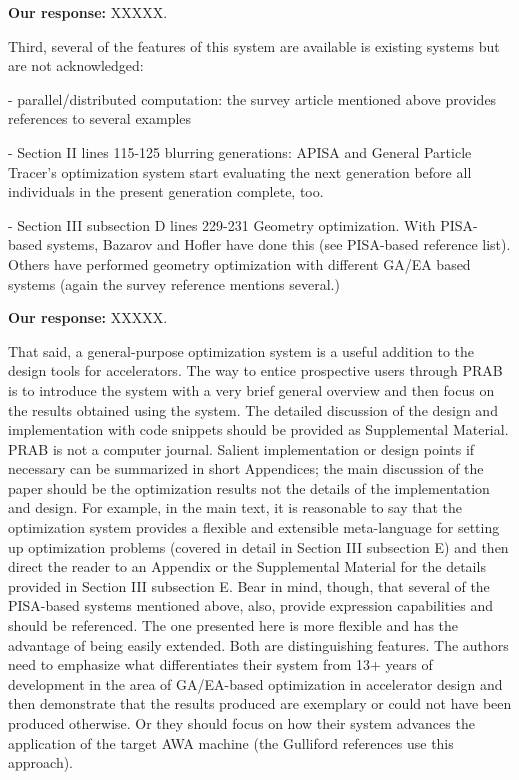 \documentclass{article}
\begin{document}
{\bf Our response:} {\color{blue} XXXXX.}

Third, several of the features of this system are available is
existing systems but are not acknowledged:

- parallel/distributed computation: the survey article mentioned above
provides references to several examples

- Section II lines 115-125 blurring generations: APISA and General
Particle Tracer’s optimization system start evaluating the next
generation before all individuals in the present generation complete,
too.

- Section III subsection D lines 229-231 Geometry optimization. With
PISA-based systems, Bazarov and Hofler have done this (see PISA-based
reference list). Others have performed geometry optimization with
different GA/EA based systems (again the survey reference mentions
several.)

{\bf Our response:} {\color{blue} XXXXX.}

That said, a general-purpose optimization system is a useful addition
to the design tools for accelerators. The way to entice prospective
users through PRAB is to introduce the system with a very brief
general overview and then focus on the results obtained using the
system. The detailed discussion of the design and implementation with
code snippets should be provided as Supplemental Material. PRAB is not
a computer journal. Salient implementation or design points if
necessary can be summarized in short Appendices; the main discussion
of the paper should be the optimization results not the details of the
implementation and design. For example, in the main text, it is
reasonable to say that the optimization system provides a flexible and
extensible meta-language for setting up optimization problems (covered
in detail in Section III subsection E) and then direct the reader to
an Appendix or the Supplemental Material for the details provided in
Section III subsection E. Bear in mind, though, that several of the
PISA-based systems mentioned above, also, provide expression
capabilities and should be referenced. The one presented here is more
flexible and has the advantage of being easily extended. Both are
distinguishing features. The authors need to emphasize what
differentiates their system from 13+ years of development in the area
of GA/EA-based optimization in accelerator design and then demonstrate
that the results produced are exemplary or could not have been
produced otherwise. Or they should focus on how their system advances
the application of the target AWA machine (the Gulliford references
use this approach).
\end{document}
